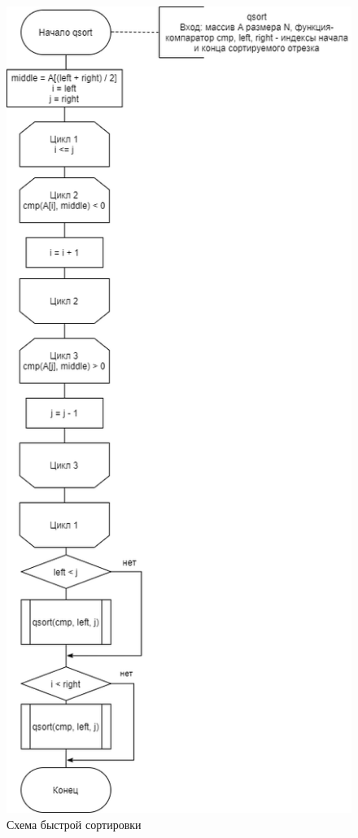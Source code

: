 \documentclass[12pt]{report}
\begin{document}
\begin{figure}[h!p]
	\raggedleft
	\includegraphics[scale=0.6]{qsort.png}
	\caption{Схема быстрой сортировки}
	\label{qsorts}
\end{figure}
\end{document}
